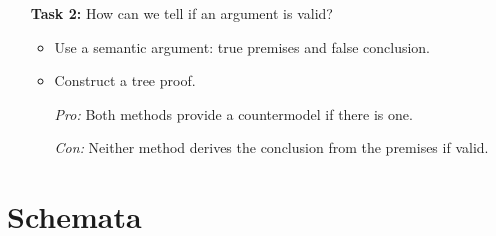 \documentclass[a4paper, 11pt]{article} %
\begin{document}
\begin{enumerate}
  \item[\bf Task 2:] How can we tell if an argument is valid? 
    \begin{itemize}
      \item Use a semantic argument: true premises and false conclusion. 
      \item Construct a tree proof.
      \item[\it Pro:] Both methods provide a countermodel if there is one.
      \item[\it Con:] Neither method derives the conclusion from the premises if valid.
    \end{itemize}
    \vspace{-.1in}
\end{enumerate}



\section*{Schemata}
\end{document}
